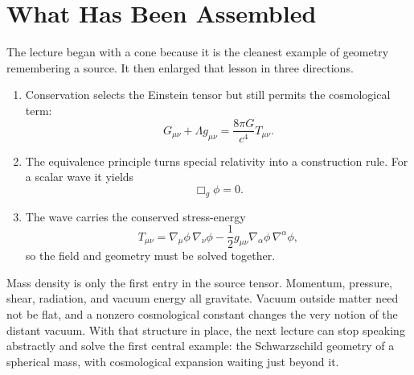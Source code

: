 \begin{classroomqa}
\end{classroomqa}

\begin{classroomqa}
\end{classroomqa}

\section{What Has Been Assembled}

The lecture began with a cone because it is the cleanest example of
geometry remembering a source.  It then enlarged that lesson in three
directions.

\begin{enumerate}
\item Conservation selects the Einstein tensor but still permits the
cosmological term:
\[
  G_{\mu\nu}+\Lambda g_{\mu\nu}
  =
  \frac{8\pi G}{c^4}T_{\mu\nu}.
\]
\item The equivalence principle turns special relativity into a
construction rule.  For a scalar wave it yields
\[
  \Box_g\phi=0.
\]
\item The wave carries the conserved stress-energy
\[
  T_{\mu\nu}
  =
  \nabla_\mu\phi\,\nabla_\nu\phi
  -
  \frac12 g_{\mu\nu}
  \nabla_\alpha\phi\,\nabla^\alpha\phi,
\]
so the field and geometry must be solved together.
\end{enumerate}

Mass density is only the first entry in the source tensor.  Momentum,
pressure, shear, radiation, and vacuum energy all gravitate.  Vacuum
outside matter need not be flat, and a nonzero cosmological constant
changes the very notion of the distant vacuum.  With that structure in
place, the next lecture can stop speaking abstractly and solve the
first central example: the Schwarzschild geometry of a spherical mass,
with cosmological expansion waiting just beyond it.
